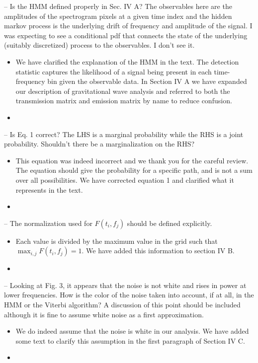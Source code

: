 \documentclass{article}
\begin{document}
\noindent
-- Is the HMM defined properly in Sec. IV A? The observables here are the amplitudes of the spectrogram pixels at a given time index and the hidden markov process is the underlying drift of frequency and amplitude of the signal. I was expecting to see a conditional pdf that connects the state of the underlying (suitably discretized) process to the observables. I don't see it.
\begin{itemize}
\item We have clarified the explanation of the HMM in the text. The detection statistic captures the likelihood of a signal being present in each time-frequency bin given the observable data. In Section IV A we have expanded our description of gravitational wave analysis and referred to both the transmission matrix and emission matrix by name to reduce confusion. 
\item[]
\end{itemize}

\noindent
-- Is Eq. 1 correct? The LHS is a marginal probability while the RHS is a joint probability. Shouldn't there be a marginalization on the RHS?
\begin{itemize}
\item This equation was indeed incorrect and we thank you for the careful review. The equation should give the probability for a specific path, and is not a sum over all possibilities. We have corrected equation 1 and clarified what it represents in the text.
\item[]
\end{itemize}

\noindent
-- The normalization used for $F(t_i, f_j)$ should be defined explicitly. 
\begin{itemize}
\item Each value is divided by the maximum value in the grid such that $\max_{i,j} F(t_i, f_j) = 1$. We have added this information to section IV B.
\item[]
\end{itemize}

\noindent
-- Looking at Fig. 3, it appears that the noise is not white and rises in power at lower frequencies. How is the color of the noise taken into account, if at all, in the HMM or the Viterbi algorithm? A discussion of this point should be included although it is fine to assume white noise as a first approximation. 
\begin{itemize}
\item We do indeed assume that the noise is white in our analysis. We have added some text to clarify this assumption in the first paragraph of Section IV C.
\item[]
\end{itemize}
\end{document}
